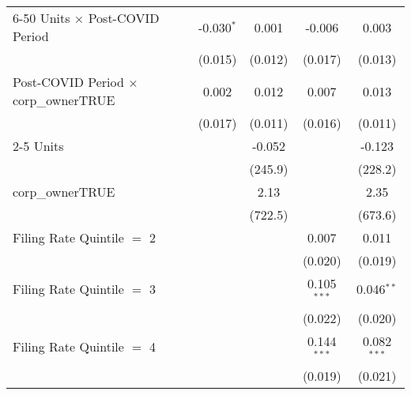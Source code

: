 \begin{table}[htbp]
\begin{tabular}{lcccc}
      6-50 Units $\times$ Post-COVID Period        & -0.030$^{*}$   & 0.001                               & -0.006                    & 0.003\\   
                                                   & (0.015)        & (0.012)                             & (0.017)                   & (0.013)\\   
      Post-COVID Period $\times$ corp\_ownerTRUE   & 0.002          & 0.012                               & 0.007                     & 0.013\\   
                                                   & (0.017)        & (0.011)                             & (0.016)                   & (0.011)\\   
      2-5 Units                                    &                & -0.052                              &                           & -0.123\\   
                                                   &                & (245.9)                             &                           & (228.2)\\   
      corp\_ownerTRUE                              &                & 2.13                                &                           & 2.35\\   
                                                   &                & (722.5)                             &                           & (673.6)\\   
      Filing Rate Quintile $=$ 2                   &                &                                     & 0.007                     & 0.011\\   
                                                   &                &                                     & (0.020)                   & (0.019)\\   
      Filing Rate Quintile $=$ 3                   &                &                                     & 0.105$^{***}$             & 0.046$^{**}$\\   
                                                   &                &                                     & (0.022)                   & (0.020)\\   
      Filing Rate Quintile $=$ 4                   &                &                                     & 0.144$^{***}$             & 0.082$^{***}$\\   
                                                   &                &                                     & (0.019)                   & (0.021)\\   

\end{tabular}
\end{table}
